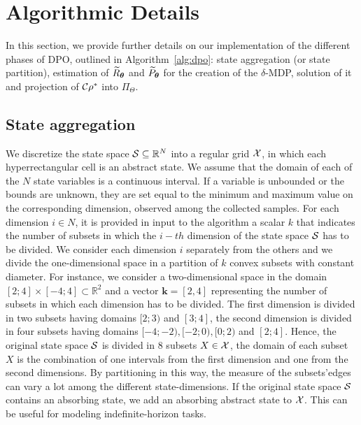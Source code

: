 \section{Algorithmic Details}\label{sec:detail}
In this section, we provide further details on our implementation of the different phases of \ac{DPO}, outlined in Algorithm~\ref{alg:dpo}: state aggregation (or state partition), estimation of $\widetilde{R}_{\boldsymbol{\theta}}$ and $\widetilde{P}_{\boldsymbol{\theta}}$ for the creation of the $\delta$-\ac{MDP}, solution of it and projection of $\mathcal{C}\rho^{*}$ into $\Pi_{\Theta}$.

\subsection{State aggregation}
We discretize the state space $\mathcal{S}\subseteq\mathbb{R}^N$ into a regular grid $\mathcal{X}$, in which each hyperrectangular cell is an abstract state. 
We assume that the domain of each of the $N$ state variables is a continuous interval. If a variable is unbounded or the bounds are unknown, they are set equal to the minimum and maximum value on the corresponding dimension, observed among the collected samples. 
For each dimension $i \in N$, it is provided in input to the algorithm a scalar $k$ that indicates the number of subsets in which the $i-th$ dimension of the state space $\mathcal{S}$ has to be divided. We consider each dimension $i$ separately from the others and we divide the one-dimensional space in a partition of $k$ convex subsets with constant diameter. For instance, we consider a two-dimensional space in the domain $[2; 4] \times [-4;4] \subset \mathbb{R}^{2}$ and a vector $\boldsymbol{k} = [2,4]$ representing the number of subsets in which each dimension has to be divided. The first dimension is divided in two subsets having domains $[2;3)$ and $[3;4]$, the second dimension is divided in four subsets having domains $[-4;-2),[-2;0),[0;2)$ and $[2;4]$. Hence, the original state space $\mathcal{S}$ is divided in $8$ subsets $X \in \mathcal{X}$, the domain of each subset $X$ is the combination of one intervals from the first dimension and one from the second dimensions. By partitioning in this way, the measure of the subsets'edges can vary a lot among the different state-dimensions.
If the original state space $\mathcal{S}$ contains an absorbing state, we add an absorbing abstract state to $\mathcal{X}$. This can be useful for modeling indefinite-horizon tasks.\\
